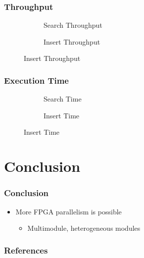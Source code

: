 \documentclass{beamer}
\begin{document}
\begin{frame}
	\frametitle{Throughput}
	\begin{figure}
		\begin{subfigure}{0.49\textwidth}
			\resizebox{\textwidth}{!}{
				
			}
			\caption{Search Throughput}
		\end{subfigure}
		\begin{subfigure}{0.49\textwidth}
			\resizebox{\textwidth}{!}{
				
			}
			\caption{Insert Throughput}
		\end{subfigure}
	\end{figure}
\end{frame}


\begin{frame}
	\frametitle{Execution Time}
	\begin{figure}
		\begin{subfigure}{0.49\textwidth}
			\resizebox{\textwidth}{!}{
				
			}
			\caption{Search Time}
		\end{subfigure}
		\begin{subfigure}{0.49\textwidth}
			\resizebox{\textwidth}{!}{
				
			}
			\caption{Insert Time}
		\end{subfigure}
	\end{figure}
\end{frame}


\section{Conclusion}

\begin{frame}
	\frametitle{Conclusion}
	\begin{itemize}
		\item More FPGA parallelism is possible
		\begin{itemize}
			\item Multimodule, heterogeneous modules
		\end{itemize}
	\end{itemize}
\end{frame}


\begin{frame}
	\frametitle{References}
	\printbibliography
\end{frame}
\end{document}
